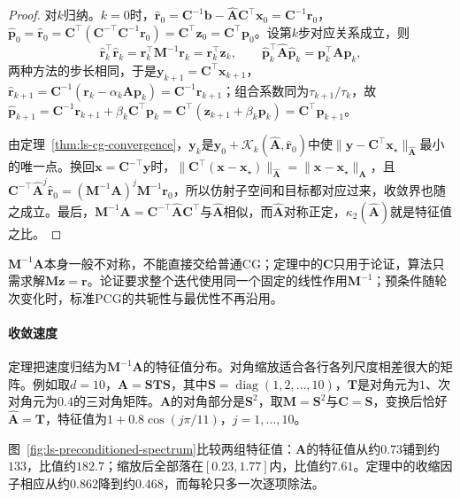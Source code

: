 \begin{proof}
对$k$归纳。$k=0$时，$\hat{\bm r}_0=\bm C^{-1}\bm b-\widehat{\bm A}\bm C^\top\bm x_0=\bm C^{-1}\bm r_0$，$\hat{\bm p}_0=\hat{\bm r}_0=\bm C^\top(\bm C^{-\top}\bm C^{-1}\bm r_0)=\bm C^\top\bm z_0=\bm C^\top\bm p_0$。设第$k$步对应关系成立，则
\[
 \hat{\bm r}_k^\top\hat{\bm r}_k=\bm r_k^\top\bm M^{-1}\bm r_k=\bm r_k^\top\bm z_k,\qquad
 \hat{\bm p}_k^\top\widehat{\bm A}\hat{\bm p}_k=\bm p_k^\top\bm A\bm p_k ,
\]
两种方法的步长相同，于是$\bm y_{k+1}=\bm C^\top\bm x_{k+1}$，$\hat{\bm r}_{k+1}=\bm C^{-1}(\bm r_k-\alpha_k\bm A\bm p_k)=\bm C^{-1}\bm r_{k+1}$；组合系数同为$\tau_{k+1}/\tau_k$，故$\hat{\bm p}_{k+1}=\bm C^{-1}\bm r_{k+1}+\beta_k\bm C^\top\bm p_k=\bm C^\top(\bm z_{k+1}+\beta_k\bm p_k)=\bm C^\top\bm p_{k+1}$。

由定理~\ref{thm:ls-cg-convergence}，$\bm y_k$是$\bm y_0+\mathcal K_k(\widehat{\bm A},\hat{\bm r}_0)$中使$\lVert\bm y-\bm C^\top\bm x_\star\rVert_{\widehat{\bm A}}$最小的唯一点。换回$\bm x=\bm C^{-\top}\bm y$时，$\lVert\bm C^\top(\bm x-\bm x_\star)\rVert_{\widehat{\bm A}}=\lVert\bm x-\bm x_\star\rVert_{\bm A}$，且$\bm C^{-\top}\widehat{\bm A}^j\hat{\bm r}_0=(\bm M^{-1}\bm A)^j\bm M^{-1}\bm r_0$，所以仿射子空间和目标都对应过来，收敛界也随之成立。最后，$\bm M^{-1}\bm A=\bm C^{-\top}\widehat{\bm A}\bm C^\top$与$\widehat{\bm A}$相似，而$\widehat{\bm A}$对称正定，$\kappa_2(\widehat{\bm A})$就是特征值之比。
\end{proof}

$\bm M^{-1}\bm A$本身一般不对称，不能直接交给普通CG；定理中的$\bm C$只用于论证，算法只需求解$\bm M\bm z=\bm r$。论证要求整个迭代使用同一个固定的线性作用$\bm M^{-1}$；预条件随轮次变化时，标准PCG的共轭性与最优性不再沿用。

\paragraph{收敛速度}
定理把速度归结为$\bm M^{-1}\bm A$的特征值分布。对角缩放适合各行各列尺度相差很大的矩阵。例如取$d=10$，$\bm A=\bm S\bm T\bm S$，其中$\bm S=\operatorname{diag}(1,2,\ldots,10)$，$\bm T$是对角元为$1$、次对角元为$0.4$的三对角矩阵。$\bm A$的对角部分是$\bm S^2$，取$\bm M=\bm S^2$与$\bm C=\bm S$，变换后恰好$\widehat{\bm A}=\bm T$，特征值为$1+0.8\cos(j\pi/11)$，$j=1,\ldots,10$。

图~\ref{fig:ls-preconditioned-spectrum}比较两组特征值：$\bm A$的特征值从约$0.73$铺到约$133$，比值约$182.7$；缩放后全部落在$[0.23,1.77]$内，比值约$7.61$。定理中的收缩因子相应从约$0.862$降到约$0.468$，而每轮只多一次逐项除法。


